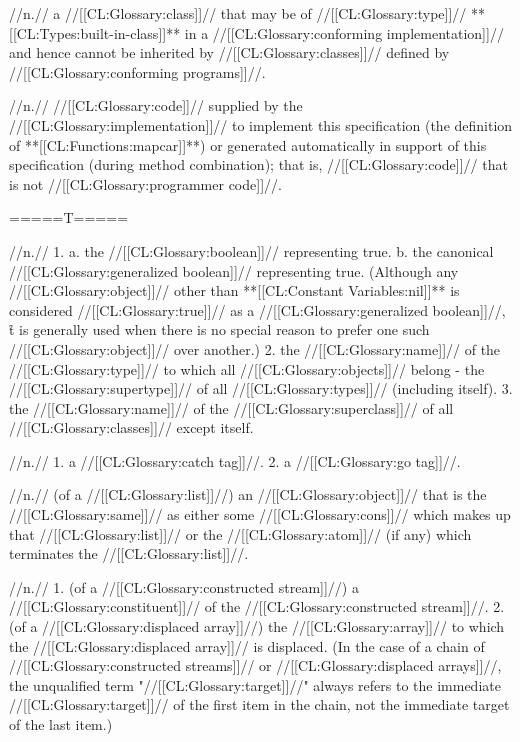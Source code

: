  //n.// a //[[CL:Glossary:class]]// that may be of //[[CL:Glossary:type]]// **[[CL:Types:built-in-class]]** in a //[[CL:Glossary:conforming implementation]]// and hence cannot be inherited by //[[CL:Glossary:classes]]// defined by //[[CL:Glossary:conforming programs]]//.

 //n.// //[[CL:Glossary:code]]// supplied by the //[[CL:Glossary:implementation]]// to implement this specification (\eg the definition of **[[CL:Functions:mapcar]]**) or generated automatically in support of this specification (\eg during method combination); that is, //[[CL:Glossary:code]]// that is not //[[CL:Glossary:programmer code]]//.


=====T=====

 //n.// 1. a. the //[[CL:Glossary:boolean]]// representing true. b. the canonical //[[CL:Glossary:generalized boolean]]// representing true. (Although any //[[CL:Glossary:object]]// other than **[[CL:Constant Variables:nil]]** is considered //[[CL:Glossary:true]]// as a //[[CL:Glossary:generalized boolean]]//, \f{t} is generally used when there is no special reason to prefer one such //[[CL:Glossary:object]]// over another.) 2. the //[[CL:Glossary:name]]// of the //[[CL:Glossary:type]]// to which all //[[CL:Glossary:objects]]// belong - the //[[CL:Glossary:supertype]]// of all //[[CL:Glossary:types]]// (including itself). 3. the //[[CL:Glossary:name]]// of the //[[CL:Glossary:superclass]]// of all //[[CL:Glossary:classes]]// except itself.
 
 //n.// 1. a //[[CL:Glossary:catch tag]]//. 2. a //[[CL:Glossary:go tag]]//.

 //n.// (of a //[[CL:Glossary:list]]//) an //[[CL:Glossary:object]]// that is the //[[CL:Glossary:same]]// as either some //[[CL:Glossary:cons]]// which makes up that //[[CL:Glossary:list]]// or the //[[CL:Glossary:atom]]// (if any) which terminates the //[[CL:Glossary:list]]//. 

 //n.// 1. (of a //[[CL:Glossary:constructed stream]]//) a //[[CL:Glossary:constituent]]// of the //[[CL:Glossary:constructed stream]]//.  2. (of a //[[CL:Glossary:displaced array]]//) the //[[CL:Glossary:array]]// to which the //[[CL:Glossary:displaced array]]// is displaced. (In the case of a chain of //[[CL:Glossary:constructed streams]]// or //[[CL:Glossary:displaced arrays]]//, the unqualified term "//[[CL:Glossary:target]]//" always refers to the immediate //[[CL:Glossary:target]]// of the first item in the chain, not the immediate target of the last item.)

